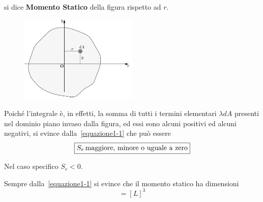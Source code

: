 \noindent si dice \textbf{Momento Statico} della figura rispetto ad $r$. 
\renewcommand{\thefigure}{1~-~3}
\begin{figure}[h]
\centering
\includegraphics[width=0.5\textwidth]{Immagini/Parte_1/Figura1_3/Figura1_3.pdf}
\caption{}
\label{figura1-3}
\end{figure}
\noindent Poiché l'integrale è, in effetti, la somma di tutti i termini elementari $\lambda dA$ presenti nel dominio piano invaso dalla figura, ed essi sono alcuni positivi ed alcuni negativi, si evince dalla~\eqref{equazione1-1} che può essere 
\begin{equation*}
\boxed{S_r\, \textup{maggiore, minore o uguale a zero}}
\end{equation*}

\noindent Nel caso specifico $S_r < 0$.

\noindent Sempre dalla~\eqref{equazione1-1} si evince che il momento statico ha dimensioni
\begin{equation*} 
[S_r]=[L]^3
\end{equation*}

